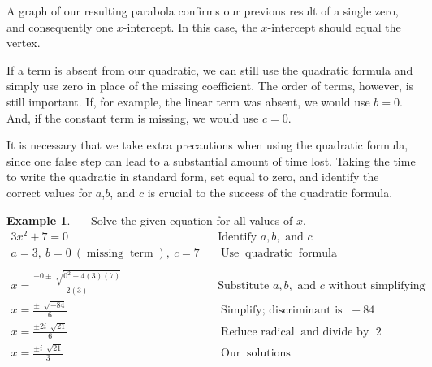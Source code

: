 \documentclass[12pt]{book}
\theoremstyle{definition}
\newtheorem{example}{Example}
\newcommand{\tmop}[1]{\ensuremath{\operatorname{#1}}}
\begin{document}
\begin{multicols}{2}
A graph of our resulting parabola confirms our previous result of a single zero, and consequently one $x$-intercept.  In this case, the $x$-intercept should equal the vertex. 
\columnbreak
\begin{center}
\end{center}
\end{multicols}
If a term is absent from our quadratic, we can still use the quadratic formula and simply use zero in place of the missing coefficient. The order of terms, however, is still important.  If, for example, the linear term was absent, we would use $b = 0$.  And, if the constant term is missing, we would use $c=0$.\par
It is necessary that we take extra precautions when using the quadratic formula, since one false step can lead to a substantial amount of time lost.  Taking the time to write the quadratic in standard form, set equal to zero, and identify the correct values for $a$,$b$, and $c$ is crucial to the success of the quadratic formula.
\begin{example}~~~Solve the given equation for all values of $x$.
  \begin{eqnarray*}
    3 x^2 + 7 = 0 &  & \text{Identify~} a,b, \text{~and~}c\\
		a = 3,~ b = 0~ (\tmop{missing} \tmop{term}),~ c = 7 & & \tmop{Use} \tmop{quadratic} \tmop{formula}\\
    & & \\
		x = \frac{- 0 \pm \sqrt[]{0^2 - 4 (3) (7)}}{2 (3)} &  & \text{Substitute~} a,b, \text{~and~} c \text{~without~simplifying}\\
    x = \frac{\pm~ \sqrt[]{- 84}}{6} &  & \tmop{Simplify;~discriminant~is~}-84\\
    x = \frac{\pm 2 i~ \sqrt[]{21}}{6} &  & \tmop{Reduce~radical} \tmop{and~divide~by~}2\\
    x = \frac{\pm i~ \sqrt[]{21}}{3} &  & \tmop{Our} \tmop{solutions}
  \end{eqnarray*}
\end{example}
\end{document}
